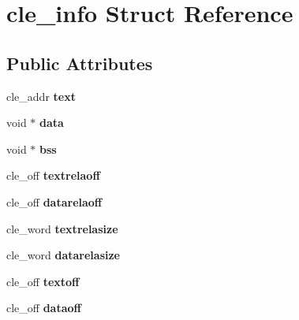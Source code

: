 \hypertarget{structcle__info}{}\section{cle\+\_\+info Struct Reference}
\label{structcle__info}
\subsection*{Public Attributes}
\begin{DoxyCompactItemize}
\item 
\hypertarget{structcle__info_a4b9537c01aeb38cfa588cddfd4a087b0}{}cle\+\_\+addr {\bfseries text}\label{structcle__info_a4b9537c01aeb38cfa588cddfd4a087b0}

\item 
\hypertarget{structcle__info_ac04138711b76b9e13a7579bf454875f9}{}void $\ast$ {\bfseries data}\label{structcle__info_ac04138711b76b9e13a7579bf454875f9}

\item 
\hypertarget{structcle__info_a7084b0b450306a7ba1e185d02e17f144}{}void $\ast$ {\bfseries bss}\label{structcle__info_a7084b0b450306a7ba1e185d02e17f144}

\item 
\hypertarget{structcle__info_a0666cdc3a76ca595e7d5fea707773598}{}cle\+\_\+off {\bfseries textrelaoff}\label{structcle__info_a0666cdc3a76ca595e7d5fea707773598}

\item 
\hypertarget{structcle__info_ab61a773119d414c676dea871a2d92137}{}cle\+\_\+off {\bfseries datarelaoff}\label{structcle__info_ab61a773119d414c676dea871a2d92137}

\item 
\hypertarget{structcle__info_ab1a779ead291b75eefb5359eef983876}{}cle\+\_\+word {\bfseries textrelasize}\label{structcle__info_ab1a779ead291b75eefb5359eef983876}

\item 
\hypertarget{structcle__info_a64f3999e03c29a021728210827ab95e9}{}cle\+\_\+word {\bfseries datarelasize}\label{structcle__info_a64f3999e03c29a021728210827ab95e9}

\item 
\hypertarget{structcle__info_ab192ac35e05a8d14176edb2de515d1f2}{}cle\+\_\+off {\bfseries textoff}\label{structcle__info_ab192ac35e05a8d14176edb2de515d1f2}

\item 
\hypertarget{structcle__info_a1394df06a35c6cccf4f708529ca1b3cf}{}cle\+\_\+off {\bfseries dataoff}\label{structcle__info_a1394df06a35c6cccf4f708529ca1b3cf}


\end{DoxyCompactItemize}
